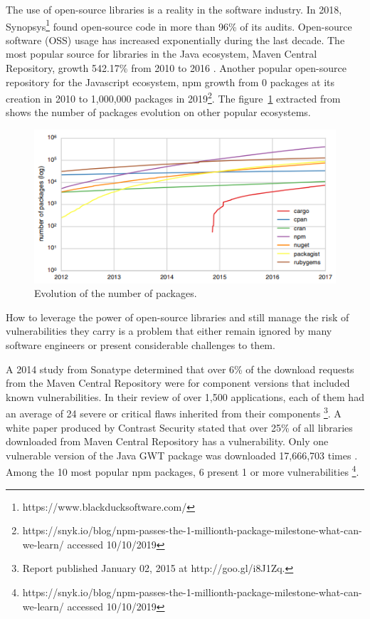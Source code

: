 \documentclass[pdf,bookmarks,colorlinks=true]{IEEEtran}
\begin{document}
The use of open-source libraries is a reality in the software industry. In 2018, Synopsys\footnote{https://www.blackducksoftware.com/} found open-source code in more than 96\% of its audits\cite{Synopsys2019}. Open-source software (OSS) usage has increased exponentially during the last decade. The most popular source for libraries in the Java ecosystem, Maven Central Repository, growth 542.17\% from 2010 to 2016 \cite{Kula2018}. Another popular open-source repository for the Javascript ecosystem, npm growth from 0 packages at its creation in 2010 to 1,000,000 packages in 2019\footnote{https://snyk.io/blog/npm-passes-the-1-millionth-package-milestone-what-can-we-learn/ accessed 10/10/2019}.   
The figure~\ref{PackageEvolution} extracted from \cite{Decan} shows the number of packages evolution on other popular ecosystems.
\begin{figure}[h]
	\centering
	\includegraphics[scale=0.70]{PackagesEvolution.png}
	\caption{Evolution of the number of packages.}
	\label{PackageEvolution}
\end{figure}
How to leverage the power of open-source libraries and still manage the risk of vulnerabilities they carry is a problem that either remain ignored by many software engineers or present considerable challenges to them.



A 2014 study from Sonatype determined that over 6\% of the download requests from the Maven Central Repository were for component versions that included known vulnerabilities. In their review of over 1,500 applications, each of them had an average of 24 severe or critical flaws inherited from their components \footnote{Report published January 02, 2015 at http://goo.gl/i8J1Zq.}.
A white paper produced by Contrast Security stated that over 25\% of all libraries downloaded from Maven Central Repository has a vulnerability. Only one vulnerable version of the Java GWT package was downloaded 17,666,703 times \cite{williams2012unfortunate}.
Among the 10 most popular npm packages, 6 present 1 or more vulnerabilities \footnote{https://snyk.io/blog/npm-passes-the-1-millionth-package-milestone-what-can-we-learn/ accessed 10/10/2019}.
\end{document}

